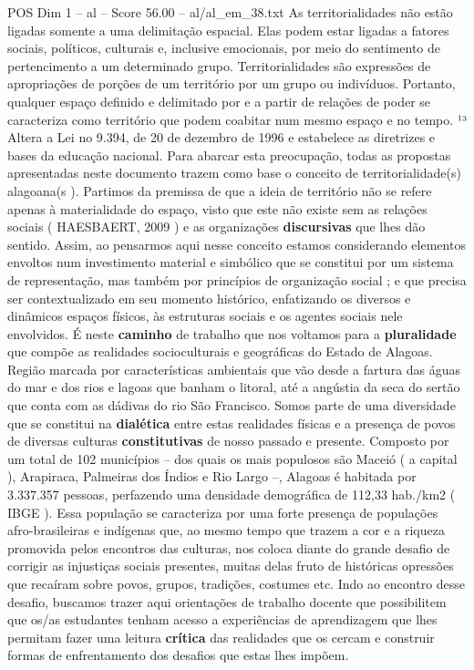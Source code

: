 \begin{textsample}{POS Dim 1 – al – Score 56.00 – al/al\_em\_38.txt}
As territorialidades não estão ligadas somente a uma delimitação espacial.
Elas podem estar ligadas a fatores sociais, políticos, culturais e, inclusive emocionais, por meio do sentimento de pertencimento a um determinado grupo.
Territorialidades são expressões de apropriações de porções de um território por um grupo ou indivíduos.
Portanto, qualquer espaço definido e delimitado por e a partir de relações de poder se caracteriza como território que podem coabitar num mesmo espaço e no tempo. ¹³ Altera a Lei no 9.394, de 20 de dezembro de 1996 e estabelece as diretrizes e bases da educação nacional.
Para abarcar esta preocupação, todas as propostas apresentadas neste documento trazem como base o conceito de territorialidade(s) alagoana(s ).
Partimos da premissa de que a ideia de território não se refere apenas à materialidade do espaço, visto que este não existe sem as relações sociais ( HAESBAERT, 2009 ) e as organizações \textbf{discursivas} que lhes dão sentido.
Assim, ao pensarmos aqui nesse conceito estamos considerando elementos envoltos num investimento material e simbólico que se constitui por um sistema de representação, mas também por princípios de organização social ; e que precisa ser contextualizado em seu momento histórico, enfatizando os diversos e dinâmicos espaços físicos, às estruturas sociais e os agentes sociais nele envolvidos.
É neste \textbf{caminho} de trabalho que nos voltamos para a \textbf{pluralidade} que compõe as realidades socioculturais e geográficas do Estado de Alagoas.
Região marcada por características ambientais que vão desde a fartura das águas do mar e dos rios e lagoas que banham o litoral, até a angústia da seca do sertão que conta com as dádivas do rio São Francisco.
Somos parte de uma diversidade que se constitui na \textbf{dialética} entre estas realidades físicas e a presença de povos de diversas culturas \textbf{constitutivas} de nosso passado e presente.
Composto por um total de 102 municípios – dos quais os mais populosos são Maceió ( a capital ), Arapiraca, Palmeiras dos Índios e Rio Largo –, Alagoas é habitada por 3.337.357 pessoas, perfazendo uma densidade demográfica de 112,33 hab./km2 ( IBGE ).
Essa população se caracteriza por uma forte presença de populações afro-brasileiras e indígenas que, ao mesmo tempo que trazem a cor e a riqueza promovida pelos encontros das culturas, nos coloca diante do grande desafio de corrigir as injustiças sociais presentes, muitas delas fruto de históricas opressões que recaíram sobre povos, grupos, tradições, costumes etc.
Indo ao encontro desse desafio, buscamos trazer aqui orientações de trabalho docente que possibilitem que os/as estudantes tenham acesso a experiências de aprendizagem que lhes permitam fazer uma leitura \textbf{crítica} das realidades que os cercam e construir formas de enfrentamento dos desafios que estas lhes impõem.

\end{textsample}
